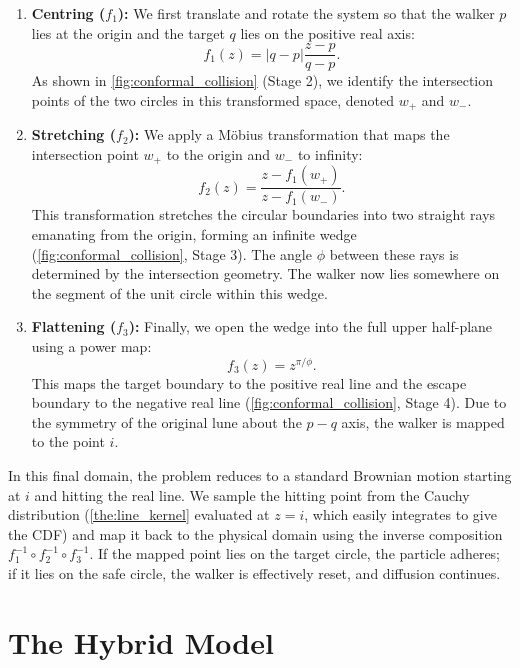 \documentclass[12pt, a4paper, oneside]{report}
\theoremstyle{remark}
\begin{document}
\begin{enumerate}
    \item \textbf{Centring ($f_1$):} We first translate and rotate the system so that the walker $p$ lies at the origin and the target $q$ lies on the positive real axis:
    \begin{equation*}
        f_1(z) = |q-p| \frac{z-p}{q-p}.
    \end{equation*}
    As shown in \cref{fig:conformal_collision} (Stage 2), we identify the intersection points of the two circles in this transformed space, denoted $w_+$ and $w_-$.

    \item \textbf{Stretching ($f_2$):} We apply a Möbius transformation that maps the intersection point $w_+$ to the origin and $w_-$ to infinity:
    \begin{equation*}
        f_2(z) = \frac{z - f_1(w_+)}{z - f_1(w_-)}.
    \end{equation*}
    This transformation stretches the circular boundaries into two straight rays emanating from the origin, forming an infinite wedge (\cref{fig:conformal_collision}, Stage 3). The angle $\phi$ between these rays is determined by the intersection geometry. The walker now lies somewhere on the segment of the unit circle within this wedge.

    \item \textbf{Flattening ($f_3$):} Finally, we open the wedge into the full upper half-plane using a power map:
    \begin{equation*}
        f_3(z) = z^{\pi/\phi}.
    \end{equation*}
    This maps the target boundary to the positive real line and the escape boundary to the negative real line (\cref{fig:conformal_collision}, Stage 4). Due to the symmetry of the original lune about the $p-q$ axis, the walker is mapped to the point $i$.
\end{enumerate}

In this final domain, the problem reduces to a standard Brownian motion starting at $i$ and hitting the real line. We sample the hitting point from the Cauchy distribution (\cref{the:line_kernel} evaluated at $z=i$, which easily integrates to give the CDF) and map it back to the physical domain using the inverse composition $f_1^{-1} \circ f_2^{-1} \circ f_3^{-1}$. If the mapped point lies on the target circle, the particle adheres; if it lies on the safe circle, the walker is effectively reset, and diffusion continues.
\section{The Hybrid Model}
\label{sec:hybrid_model}
\end{document}
